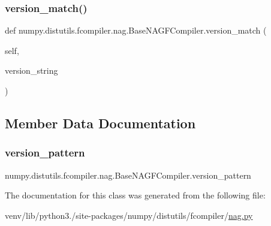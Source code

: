 \subsubsection{\texorpdfstring{version\+\_\+match()}{version\_match()}}
{\footnotesize\ttfamily def numpy.\+distutils.\+fcompiler.\+nag.\+Base\+N\+A\+G\+F\+Compiler.\+version\+\_\+match (\begin{DoxyParamCaption}\item[{}]{self,  }\item[{}]{version\+\_\+string }\end{DoxyParamCaption})}



\subsection{Member Data Documentation}
\mbox{\label{classnumpy_1_1distutils_1_1fcompiler_1_1nag_1_1BaseNAGFCompiler_a3a614241af5ff588e2d5760c29922288}} 
\subsubsection{\texorpdfstring{version\+\_\+pattern}{version\_pattern}}
{\footnotesize\ttfamily numpy.\+distutils.\+fcompiler.\+nag.\+Base\+N\+A\+G\+F\+Compiler.\+version\+\_\+pattern\hspace{0.3cm}{\ttfamily [static]}}



The documentation for this class was generated from the following file\+:\begin{DoxyCompactItemize}
\item 
venv/lib/python3./site-\/packages/numpy/distutils/fcompiler/\hyperlink{nag_8py}{nag.\+py}\end{DoxyCompactItemize}
